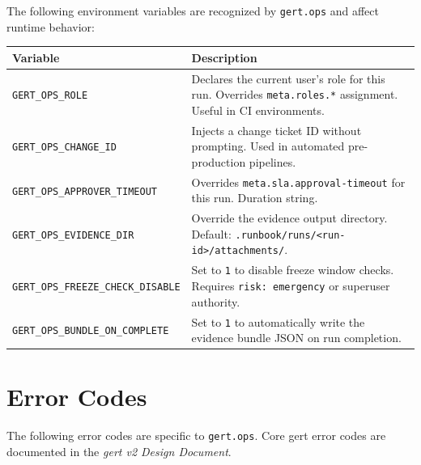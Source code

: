 The following environment variables are recognized by \texttt{gert.ops} and affect runtime
behavior:

\begin{center}
\small
\begin{tabular}{lp{8cm}}
\textbf{Variable} & \textbf{Description} \\
\hline
\texttt{GERT\_OPS\_ROLE} & Declares the current user's role for this run. Overrides
  \texttt{meta.roles.*} assignment. Useful in CI environments. \\
\texttt{GERT\_OPS\_CHANGE\_ID} & Injects a change ticket ID without prompting. Used in
  automated pre-production pipelines. \\
\texttt{GERT\_OPS\_APPROVER\_TIMEOUT} & Overrides \texttt{meta.sla.approval-timeout} for
  this run. Duration string. \\
\texttt{GERT\_OPS\_EVIDENCE\_DIR} & Override the evidence output directory.
  Default: \texttt{.runbook/runs/<run-id>/attachments/}. \\
\texttt{GERT\_OPS\_FREEZE\_CHECK\_DISABLE} & Set to \texttt{1} to disable freeze window
  checks. Requires \texttt{risk: emergency} or superuser authority. \\
\texttt{GERT\_OPS\_BUNDLE\_ON\_COMPLETE} & Set to \texttt{1} to automatically write the
  evidence bundle JSON on run completion. \\
\end{tabular}
\end{center}

\section{Error Codes}
\label{sec:ref-error-codes}

The following error codes are specific to \texttt{gert.ops}. Core gert error codes are
documented in the \emph{gert v2 Design Document}.


